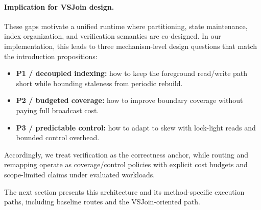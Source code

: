 \paragraph{Implication for VSJoin design.}
These gaps motivate a unified runtime where partitioning, state maintenance, index organization, and verification semantics are co-designed. In our implementation, this leads to three mechanism-level design questions that match the introduction propositions:
\begin{itemize}
\item \textbf{P1 / decoupled indexing:} how to keep the foreground read/write path short while bounding staleness from periodic rebuild.
\item \textbf{P2 / budgeted coverage:} how to improve boundary coverage without paying full broadcast cost.
\item \textbf{P3 / predictable control:} how to adapt to skew with lock-light reads and bounded control overhead.
\end{itemize}
Accordingly, we treat verification as the correctness anchor, while routing and remapping operate as coverage/control policies with explicit cost budgets and scope-limited claims under evaluated workloads.

The next section presents this architecture and its method-specific execution paths, including baseline routes and the VSJoin-oriented path.
